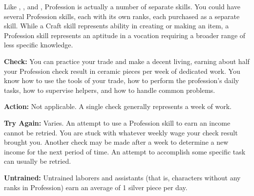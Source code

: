 Like , , and , Profession is actually a number of separate skills. You could have several Profession skills, each with its own ranks, each purchased as a separate skill. While a Craft skill represents ability in creating or making an item, a Profession skill represents an aptitude in a vocation requiring a broader range of less specific knowledge.

\textbf{Check:} You can practice your trade and make a decent living, earning about half your Profession check result in ceramic pieces per week of dedicated work. You know how to use the tools of your trade, how to perform the profession's daily tasks, how to supervise helpers, and how to handle common problems.

\textbf{Action:} Not applicable. A single check generally represents a week of work.

\textbf{Try Again:} Varies. An attempt to use a Profession skill to earn an income cannot be retried. You are stuck with whatever weekly wage your check result brought you. Another check may be made after a week to determine a new income for the next period of time. An attempt to accomplish some specific task can usually be retried.

\textbf{Untrained:} Untrained laborers and assistants (that is, characters without any ranks in Profession) earn an average of 1 silver piece per day.